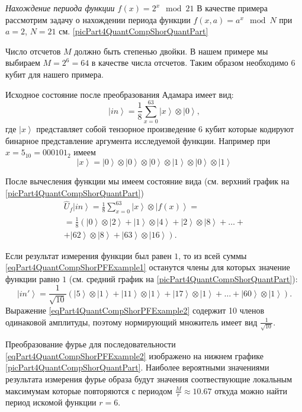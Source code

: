 \begin{example}
\emph{Нахождение периода функции $f\left(x\right) = 2^x \mod 21$}
\label{exPart4QuantCompShorQuantPeriodFinding}
В качестве примера рассмотрим задачу о нахождении периода функции 
$f\left(x, a\right) = a^x \mod{N}$ при $a=2$, $N = 21$ см. 
\autoref{picPart4QuantCompShorQuantPart}

Число отсчетов  $M$ должно быть степенью двойки. В нашем примере мы
выбираем $M = 2^6 = 64$ в качестве числа отсчетов. Таким образом
необходимо 6 кубит для нашего примера.

Исходное состояние после  преобразования Адамара имеет вид:
\begin{equation}
\left|in\right> = \frac{1}{8}\sum_{x = 0}^{63}\left|x\right> \otimes \left|0\right>,
\nonumber
\end{equation}
где $\left|x\right>$ представляет собой тензорное произведение 6 кубит
которые кодируют бинарное представление аргумента исследуемой
функции. Например при $x=5_{10}=000101_2$ имеем
\[
\left|x\right> = \left|0\right>\otimes \left|0\right>\otimes
\left|0\right>\otimes 
\left|1\right>\otimes \left|0\right>\otimes \left|1\right>
\]

После вычесления функции мы имеем состояние вида (см. верхний график
на \autoref{picPart4QuantCompShorQuantPart})
\begin{eqnarray}
\hat{U}_f\left|in\right> = \frac{1}{8}\sum_{x = 0}^{63}\left|x\right>
\otimes \left|f\left(x\right)\right> = 
\nonumber \\
=
\frac{1}{8}
\left(
\left|0\right>\otimes\left|2\right> + 
\left|1\right>\otimes\left|4\right> + 
\left|2\right>\otimes\left|8\right> + \dots +
\right.
\nonumber \\
\left.
+
\left|62\right>\otimes\left|8\right> +
\left|63\right>\otimes\left|16\right>
\right).
\label{eqPart4QuantCompShorPFExample1}
\end{eqnarray}

Если результат измерения функции был равен $1$, то из всей суммы
\eqref{eqPart4QuantCompShorPFExample1} останутся члены для которых
значение функции равно $1$ (см. средний график
на \autoref{picPart4QuantCompShorQuantPart}):
\begin{equation}
\left|in'\right> = \frac{1}{\sqrt{10}}\left( 
\left|5\right>\otimes\left|1\right> +
\left|11\right>\otimes\left|1\right> +
\left|17\right>\otimes\left|1\right> +
\dots +
\left|60\right>\otimes\left|1\right>
\right).
\label{eqPart4QuantCompShorPFExample2}
\end{equation} 
Выражение \eqref{eqPart4QuantCompShorPFExample2} содержит 10 членов
одинаковой амплитуды, поэтому нормирующий множитель имеет вид
$\frac{1}{\sqrt{10}}$.

Преобразование фурье для последовательности
\eqref{eqPart4QuantCompShorPFExample2} изображено на нижнем графике
\autoref{picPart4QuantCompShorQuantPart}. Наиболее вероятными
значениями результата измерения фурье образа будут значения
соотвествующие локальным максимумам которые повторяются с периодом 
$\frac{M}{r}\approx10.67$ откуда можно найти период искомой функции
$r=6$. 

\end{example}
